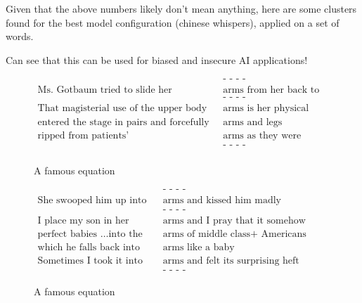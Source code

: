\documentclass[a4paper,12pt,twoside,openright]{report}
\begin{document}
Given that the above numbers likely don't mean anything, here are some clusters found for the best model configuration (chinese whispers), applied on a set of words.



Can see that this can be used for biased and insecure AI applications!

\begin{figure}[H]
\begin{align}
\text{                                                                  } & \text{- - - -} \nonumber \\
\text{Ms. Gotbaum tried to slide her handcuffed } & \text{arms from her back to her front} \nonumber \\
\text{                                                                  } & \text{- - - -} \nonumber \\
               \text{That magisterial use of the upper body and } & \text{arms is her physical signature} \nonumber \\
\text{entered the stage in pairs and forcefully stretched their } & \text{arms and legs} \nonumber \\ 
                                    \text{ripped from patients’ } & \text{arms as they were carried away} \nonumber \\
                                    \text{                                                                  } & \text{- - - -} \nonumber \\
\end{align}
\caption{A famous equation}
\end{figure}


\begin{figure}[H]
\begin{align}
\text{                                              } & \text{- - - -} \nonumber \\
\text{She swooped him up into her } & \text{arms and kissed him madly} \nonumber \\
\text{                                              } & \text{- - - -} \nonumber \\
\text{I place my son in her } & \text{arms and I pray that it somehow comforts her} \nonumber \\
\text{perfect babies \ldots into the loving } & \text{arms of middle class+ Americans} \nonumber \\
\text{which he falls back into her } & \text{arms like a baby} \nonumber \\
\text{Sometimes I took it into my } & \text{arms and felt its surprising heft} \nonumber \\
\text{                                              } & \text{- - - -} \nonumber
\end{align}
\caption{A famous equation}
\end{figure}
\end{document}
